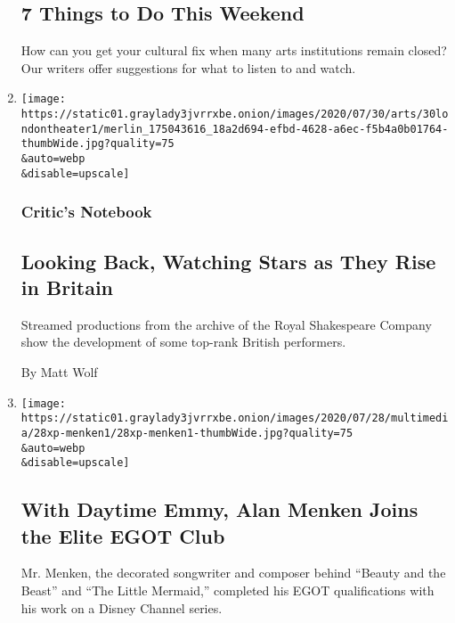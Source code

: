 \begin{enumerate}
  \hypertarget{7-things-to-do-this-weekend}{%
  \subsection{7 Things to Do This
  Weekend}\label{7-things-to-do-this-weekend}}

  How can you get your cultural fix when many arts institutions remain
  closed? Our writers offer suggestions for what to listen to and watch.
\item
  \href{/2020/07/30/theater/patsy-ferran-michelle-terry-lucian-msamati.html}{}

  \texttt{[image: https://static01.graylady3jvrrxbe.onion/images/2020/07/30/arts/30londontheater1/merlin\_175043616\_18a2d694-efbd-4628-a6ec-f5b4a0b01764-thumbWide.jpg?quality=75\\\&auto=webp\\\&disable=upscale]}

  \hypertarget{critics-notebook-1}{%
  \subsubsection{Critic's Notebook}\label{critics-notebook-1}}

  \hypertarget{looking-back-watching-stars-as-they-rise-in-britain}{%
  \subsection{Looking Back, Watching Stars as They Rise in
  Britain}\label{looking-back-watching-stars-as-they-rise-in-britain}}

  Streamed productions from the archive of the Royal Shakespeare Company
  show the development of some top-rank British performers.

  By Matt Wolf
\item
  \href{/2020/07/28/arts/alan-menken-egot.html}{}

  \texttt{[image: https://static01.graylady3jvrrxbe.onion/images/2020/07/28/multimedia/28xp-menken1/28xp-menken1-thumbWide.jpg?quality=75\\\&auto=webp\\\&disable=upscale]}

  \hypertarget{with-daytime-emmy-alan-menken-joins-the-elite-egot-club}{%
  \subsection{With Daytime Emmy, Alan Menken Joins the Elite EGOT
  Club}\label{with-daytime-emmy-alan-menken-joins-the-elite-egot-club}}

  Mr. Menken, the decorated songwriter and composer behind ``Beauty and
  the Beast'' and ``The Little Mermaid,'' completed his EGOT
  qualifications with his work on a Disney Channel series.


\end{enumerate}

